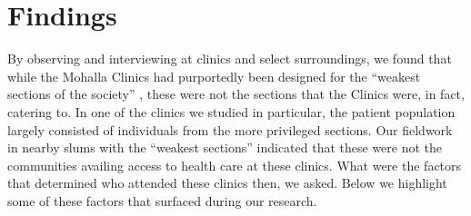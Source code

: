 \section{Findings} %
By observing and interviewing at clinics and select surroundings, we found that while the Mohalla Clinics had purportedly been designed for the ``weakest sections of the society'' \cite{AAPpressrelease}, these were not the sections that the Clinics were, in fact, catering to. In one of the clinics we studied in particular, the patient population largely consisted of individuals from the more privileged sections. Our fieldwork in nearby slums with the ``weakest sections'' indicated that these were not the communities availing access to health care at these clinics. What were the factors that determined who attended these clinics then, we asked. Below we highlight some of these factors that surfaced during our research. 

